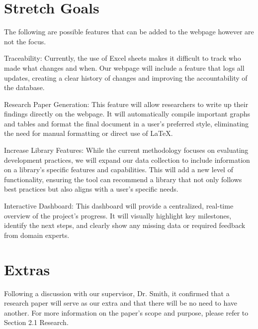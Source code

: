 \documentclass{article}
\begin{document}
\section{Stretch Goals}
The following are possible features that can be added to the webpage however are not the focus.
    \item Traceability: Currently, the use of Excel sheets makes it difficult to track who made what changes and when. Our webpage will include a feature that logs all updates, creating a clear history of changes and improving the accountability of the database.
    \item Research Paper Generation: This feature will allow researchers to write up their findings directly on the webpage. It will automatically compile important graphs and tables and format the final document in a user's preferred style, eliminating the need for manual formatting or direct use of LaTeX.
    \item Increase Library Features: While the current methodology focuses on evaluating development practices, we will expand our data collection to include information on a library's specific features and capabilities. This will add a new level of functionality, ensuring the tool can recommend a library that not only follows best practices but also aligns with a user's specific needs.
    \item Interactive Dashboard: This dashboard will provide a centralized, real-time overview of the project's progress. It will visually highlight key milestones, identify the next steps, and clearly show any missing data or required feedback from domain experts.
\section{Extras}
Following a discussion with our supervisor, Dr. Smith, it confirmed that a research paper will serve as our extra and that there will be no need to have another.
For more information on the paper's scope and purpose, please refer to Section 2.1 Research.

\end{document}
